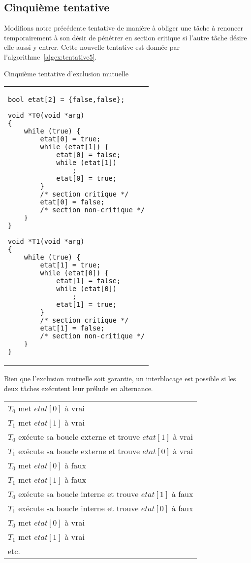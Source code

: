 \subsection*{Cinquième tentative}
Modifions notre précédente tentative de manière à obliger une tâche à renoncer temporairement à son désir de pénétrer en section critique si l'autre tâche désire elle aussi y entrer.
Cette nouvelle tentative est donnée par l'algorithme~\ref{algex:tentative5}.
\begin{algorithm}[!ht]
\caption{Cinquième tentative d'exclusion mutuelle}\label{algex:tentative5}
\centering
\begin{tabular}{l}
\lstset{language=C++}
\begin{lstlisting}
bool etat[2] = {false,false};

void *T0(void *arg)
{
	while (true) {
		etat[0] = true;
		while (etat[1]) {
			etat[0] = false;
			while (etat[1])
				;
			etat[0] = true;
		}
		/* section critique */
		etat[0] = false;
		/* section non-critique */
	}
}

void *T1(void *arg)
{
	while (true) {
		etat[1] = true;
		while (etat[0]) {
			etat[1] = false;
			while (etat[0])
				;
			etat[1] = true;
		}
		/* section critique */
		etat[1] = false;
		/* section non-critique */
	}
}
\end{lstlisting}
\end{tabular}

\end{algorithm}

Bien que l'exclusion mutuelle soit garantie, un interblocage est possible si les deux tâches exécutent leur prélude en alternance.
\par\noindent
\centering
\begin{tabular}{l}
$T_0$ met $etat[0]$ à vrai \\
$T_1$ met $etat[1]$ à vrai \\
$T_0$ exécute sa boucle externe et trouve $etat[1]$ à vrai \\
$T_1$ exécute sa boucle externe et trouve $etat[0]$ à vrai \\
$T_0$ met $etat[0]$ à faux  \\
$T_1$ met $etat[1]$ à faux \\
$T_0$ exécute sa boucle interne et trouve $etat[1]$ à faux \\
$T_1$ exécute sa boucle interne et trouve $etat[0]$ à faux \\
$T_0$ met $etat[0]$ à vrai \\
$T_1$ met $etat[1]$ à vrai \\
etc. \\
\end{tabular}

